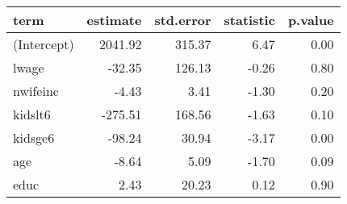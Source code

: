 \begin{tabular}{lrrrr}
  \hline
term & estimate & std.error & statistic & p.value \\ 
  \hline
(Intercept) & 2041.92 & 315.37 & 6.47 & 0.00 \\ 
  lwage & -32.35 & 126.13 & -0.26 & 0.80 \\ 
  nwifeinc & -4.43 & 3.41 & -1.30 & 0.20 \\ 
  kidslt6 & -275.51 & 168.56 & -1.63 & 0.10 \\ 
  kidsge6 & -98.24 & 30.94 & -3.17 & 0.00 \\ 
  age & -8.64 & 5.09 & -1.70 & 0.09 \\ 
  educ & 2.43 & 20.23 & 0.12 & 0.90 \\ 
   \hline
\end{tabular}
